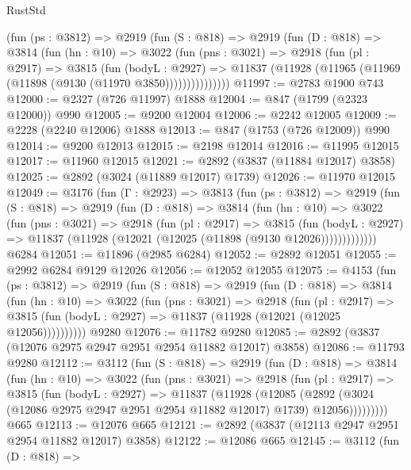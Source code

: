\begin{lexlean}{RustStd}
\begin{coremodule}
        (fun (ps : @3812) =>
        @2919
          (fun (S : @818) =>
          @2919
            (fun (D : @818) =>
            @3814
              (fun (hn : @10) =>
              @3022
                (fun (pns : @3021) =>
                @2918
                  (fun (pl : @2917) =>
                  @3815
                    (fun (bodyL : @2927) =>
                    @11837 (@11928 (@11965 (@11969 (@11898 (@9130 (@11970 @3850)))))))))))))))
@11997 := @2783 @1900 @743
@12000 := @2327 (@726 @11997) @1888
@12004 := @847 (@1799 (@2323 @12000)) @990
@12005 := @9200 @12004
@12006 := @2242 @12005
@12009 := @2228 (@2240 @12006) @1888
@12013 := @847 (@1753 (@726 @12009)) @990
@12014 := @9200 @12013
@12015 := @2198 @12014
@12016 := @11995 @12015
@12017 := @11960 @12015
@12021 := @2892 (@3837 (@11884 @12017) @3858)
@12025 := @2892 (@3024 (@11889 @12017) @1739)
@12026 := @11970 @12015
@12049 := @3176
    (fun (Γ : @2923) =>
    @3813
      (fun (ps : @3812) =>
      @2919
        (fun (S : @818) =>
        @2919
          (fun (D : @818) =>
          @3814
            (fun (hn : @10) =>
            @3022
              (fun (pns : @3021) =>
              @2918
                (fun (pl : @2917) =>
                @3815
                  (fun (bodyL : @2927) =>
                  @11837 (@11928 (@12021 (@12025 (@11898 (@9130 @12026)))))))))))))
    @6284
@12051 := @11896 (@2985 @6284)
@12052 := @2892 @12051
@12055 := @2992 @6284 @9129 @12026
@12056 := @12052 @12055
@12075 := @4153
    (fun (ps : @3812) =>
    @2919
      (fun (S : @818) =>
      @2919
        (fun (D : @818) =>
        @3814
          (fun (hn : @10) =>
          @3022
            (fun (pns : @3021) =>
            @2918
              (fun (pl : @2917) =>
              @3815 (fun (bodyL : @2927) => @11837 (@11928 (@12021 (@12025 @12056))))))))))
    @9280
@12076 := @11782 @9280
@12085 := @2892 (@3837 (@12076 @2975 @2947 @2951 @2954 @11882 @12017) @3858)
@12086 := @11793 @9280
@12112 := @3112
    (fun (S : @818) =>
    @2919
      (fun (D : @818) =>
      @3814
        (fun (hn : @10) =>
        @3022
          (fun (pns : @3021) =>
          @2918
            (fun (pl : @2917) =>
            @3815
              (fun (bodyL : @2927) =>
              @11837
                (@11928
                  (@12085
                    (@2892
                      (@3024 (@12086 @2975 @2947 @2951 @2954 @11882 @12017) @1739)
                      @12056)))))))))
    @665
@12113 := @12076 @665
@12121 := @2892 (@3837 (@12113 @2947 @2951 @2954 @11882 @12017) @3858)
@12122 := @12086 @665
@12145 := @3112
    (fun (D : @818) =>

\end{coremodule}
\end{lexlean}
